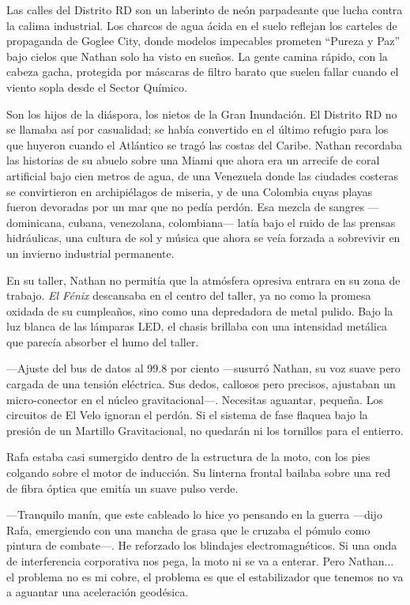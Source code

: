 \documentclass[12pt,a4paper]{book}
\begin{document}
Las calles del Distrito RD son un laberinto de neón parpadeante que lucha contra la calima industrial. Los charcos de agua ácida en el suelo reflejan los carteles de propaganda de Goglee City, donde modelos impecables prometen ``Pureza y Paz'' bajo cielos que Nathan solo ha visto en sueños. La gente camina rápido, con la cabeza gacha, protegida por máscaras de filtro barato que suelen fallar cuando el viento sopla desde el Sector Químico.

Son los hijos de la diáspora, los nietos de la Gran Inundación. El Distrito RD no se llamaba así por casualidad; se había convertido en el último refugio para los que huyeron cuando el Atlántico se tragó las costas del Caribe. Nathan recordaba las historias de su abuelo sobre una Miami que ahora era un arrecife de coral artificial bajo cien metros de agua, de una Venezuela donde las ciudades costeras se convirtieron en archipiélagos de miseria, y de una Colombia cuyas playas fueron devoradas por un mar que no pedía perdón. Esa mezcla de sangres ---dominicana, cubana, venezolana, colombiana--- latía bajo el ruido de las prensas hidráulicas, una cultura de sol y música que ahora se veía forzada a sobrevivir en un invierno industrial permanente.

En su taller, Nathan no permitía que la atmósfera opresiva entrara en su zona de trabajo. \textit{El Fénix} descansaba en el centro del taller, ya no como la promesa oxidada de su cumpleaños, sino como una depredadora de metal pulido. Bajo la luz blanca de las lámparas LED, el chasis brillaba con una intensidad metálica que parecía absorber el humo del taller.

---Ajuste del bus de datos al 99.8 por ciento ---susurró Nathan, su voz suave pero cargada de una tensión eléctrica. Sus dedos, callosos pero precisos, ajustaban un micro-conector en el núcleo gravitacional---. Necesitas aguantar, pequeña. Los circuitos de El Velo ignoran el perdón. Si el sistema de fase flaquea bajo la presión de un Martillo Gravitacional, no quedarán ni los tornillos para el entierro.

Rafa estaba casi sumergido dentro de la estructura de la moto, con los pies colgando sobre el motor de inducción. Su linterna frontal bailaba sobre una red de fibra óptica que emitía un suave pulso verde.

---Tranquilo manín, que este cableado lo hice yo pensando en la guerra ---dijo Rafa, emergiendo con una mancha de grasa que le cruzaba el pómulo como pintura de combate---. He reforzado los blindajes electromagnéticos. Si una onda de interferencia corporativa nos pega, la moto ni se va a enterar. Pero Nathan... el problema no es mi cobre, el problema es que el estabilizador que tenemos no va a aguantar una aceleración geodésica.
\end{document}
